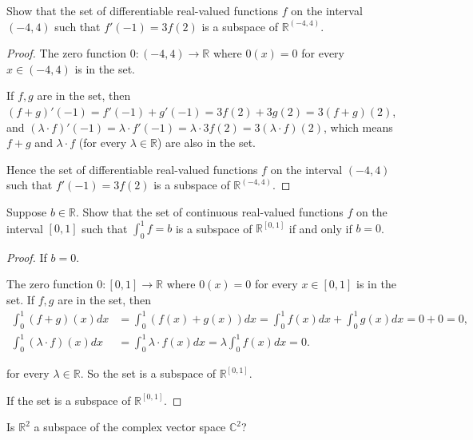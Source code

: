 \begin{exercise}
    Show that the set of differentiable real-valued functions $f$ on the interval $(-4, 4)$ such that $f'(-1) = 3f(2)$ is a subspace of $\mathbb{R}^{(-4, 4)}$.
\end{exercise}

\begin{proof}
    The zero function $0: (-4, 4)\to \mathbb{R}$ where $0(x) = 0$ for every $x\in (-4, 4)$ is in the set.

    If $f, g$ are in the set, then $(f + g)'(-1) = f'(-1) + g'(-1) = 3f(2) + 3g(2) = 3 (f + g)(2)$, and $(\lambda\cdot f)'(-1) = \lambda\cdot f'(-1) = \lambda\cdot 3 f(2) = 3 (\lambda\cdot f)(2)$, which means $f + g$ and $\lambda\cdot f$ (for every $\lambda\in\mathbb{R}$) are also in the set.

    Hence the set of differentiable real-valued functions $f$ on the interval $(-4, 4)$ such that $f'(-1) = 3f(2)$ is a subspace of $\mathbb{R}^{(-4, 4)}$.
\end{proof}

\begin{exercise}
    Suppose $b\in\mathbb{R}$. Show that the set of continuous real-valued functions $f$ on the interval $[0, 1]$ such that $\int^{1}_{0} f = b$ is a subspace of $\mathbb{R}^{[0,1]}$ if and only if $b = 0$.
\end{exercise}

\begin{proof}
    If $b = 0$.

    The zero function $0: [0, 1]\to \mathbb{R}$ where $0(x) = 0$ for every $x\in [0, 1]$ is in the set. If $f, g$ are in the set, then
    \begin{align*}
        \int^{1}_{0}(f + g)(x)dx          & = \int^{1}_{0}(f(x) + g(x))dx = \int^{1}_{0}f(x)dx + \int^{1}_{0}g(x)dx = 0 + 0 = 0, \\
        \int^{1}_{0}(\lambda\cdot f)(x)dx & = \int^{1}_{0}\lambda\cdot f(x)dx = \lambda\int^{1}_{0}f(x)dx = 0.
    \end{align*}

    for every $\lambda \in \mathbb{R}$. So the set is a subspace of $\mathbb{R}^{[0, 1]}$.

    If the set is a subspace of $\mathbb{R}^{[0, 1]}$.
\end{proof}

\begin{exercise}
    Is $\mathbb{R}^{2}$ a subspace of the complex vector space $\mathbb{C}^{2}$?
\end{exercise}

